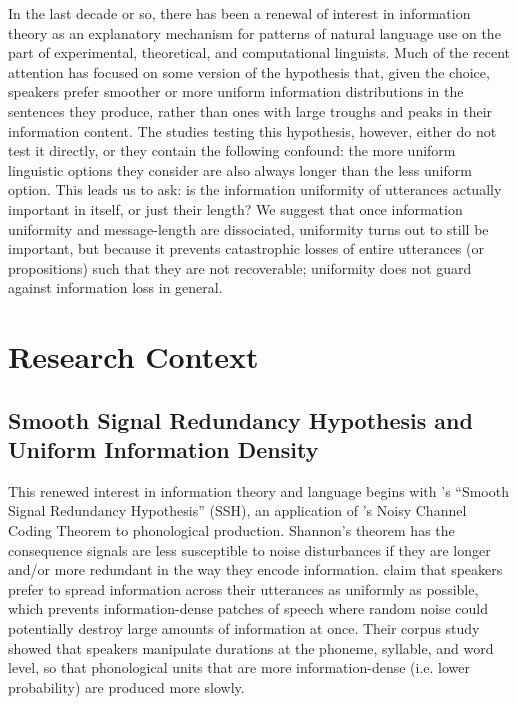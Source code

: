 \documentclass[12pt]{article}
\begin{document}
In the last decade or so, there has been a renewal of interest in information theory as an explanatory mechanism for patterns of natural language use on the part of experimental, theoretical, and computational linguists. Much of the recent attention has focused on some version of the hypothesis that, given the choice, speakers prefer smoother or more uniform information distributions in the sentences they produce, rather than ones with large troughs and peaks in their information content. The studies testing this hypothesis, however, either do not test it directly, or they contain the following confound: the more uniform linguistic options they consider are also always longer than the less uniform option. This leads us to ask: is the information uniformity of utterances actually important in itself, or just their length? We suggest that once information uniformity and message-length are dissociated, uniformity turns out to still be important, but because it prevents catastrophic losses of entire utterances (or propositions) such that they are not recoverable; uniformity does not guard against information loss in general. 
 

\section{Research Context}

\subsection{Smooth Signal Redundancy Hypothesis and Uniform Information Density}

This renewed interest in information theory and language begins with \citet{aylettturk2004}'s ``Smooth Signal Redundancy Hypothesis'' (SSH), an application of \citet{shannon1948}'s Noisy Channel Coding Theorem to phonological production. Shannon's theorem has the consequence signals are less susceptible to noise disturbances if they are longer and/or more redundant in the way they encode information. \citet{aylettturk2004} claim that speakers prefer to spread information across their utterances as uniformly as possible, which prevents information-dense patches of speech where random noise could potentially destroy large amounts of information at once. Their corpus study showed that speakers manipulate durations at the phoneme, syllable, and word level, so that phonological units that are more information-dense (i.e. lower probability) are produced more slowly.
\end{document}
